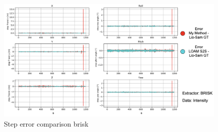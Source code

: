 {    \begin{figure}[ht]
        \centering
        \includegraphics[scale = 0.25]{images/comparison_appendix/step_error_brisk.png}
        \caption{Step error comparison brisk}
        \label{fig:step_error_comparison_brisk}
    \end{figure}
    \clearpage
}

